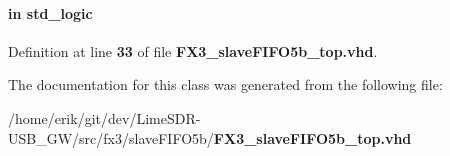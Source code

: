 \paragraph[{usb\+\_\+speed}]{ {\bfseries \textcolor{keywordflow}{in}\textcolor{vhdlchar}{ }} {\bfseries \textcolor{comment}{std\+\_\+logic}\textcolor{vhdlchar}{ }} \hspace{0.3cm}{\ttfamily [Port]}}\label{classFX3__slaveFIFO5b__top_a4f24827b8507b0c51581ac61ca8df605}


Definition at line {\bf 33} of file {\bf F\+X3\+\_\+slave\+F\+I\+F\+O5b\+\_\+top.\+vhd}.



The documentation for this class was generated from the following file\+:\begin{DoxyCompactItemize}
\item 
/home/erik/git/dev/\+Lime\+S\+D\+R-\/\+U\+S\+B\+\_\+\+G\+W/src/fx3/slave\+F\+I\+F\+O5b/{\bf F\+X3\+\_\+slave\+F\+I\+F\+O5b\+\_\+top.\+vhd}\end{DoxyCompactItemize}
